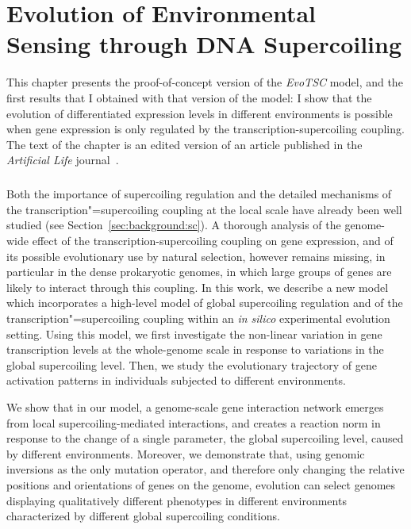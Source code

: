 \chapter{Evolution of Environmental Sensing through DNA Supercoiling}
\label{chap:alife}

This chapter presents the proof-of-concept version of the \emph{EvoTSC} model, and the first results that I obtained with that version of the model: I show that the evolution of differentiated expression levels in different environments is possible when gene expression is only regulated by the transcription-supercoiling coupling.
The text of the chapter is an edited version of an article published in the \emph{Artificial Life} journal~\citep{grohens2022a}.

\paragraph{}
Both the importance of supercoiling regulation and the detailed mechanisms of the transcription"=supercoiling coupling at the local scale have already been well studied (see Section~\ref{sec:background:sc}). A thorough analysis of the genome-wide effect of the transcription-supercoiling coupling on gene expression, and of its possible evolutionary use by natural selection, however remains missing, in particular in the dense prokaryotic genomes, in which large groups of genes are likely to interact through this coupling.
In this work, we describe a new model which incorporates a high-level model of global supercoiling regulation and of the transcription"=supercoiling coupling within an \emph{in silico} experimental evolution setting.
Using this model, we first investigate the non-linear variation in gene transcription levels at the whole-genome scale in response to variations in the global supercoiling level.
Then, we study the evolutionary trajectory of gene activation patterns in individuals subjected to different environments.

We show that in our model, a genome-scale gene interaction network emerges from local supercoiling-mediated interactions, and creates a reaction norm in response to the change of a single parameter, the global supercoiling level, caused by different environments.
Moreover, we demonstrate that, using genomic inversions as the only mutation operator, and therefore only changing the relative positions and orientations of genes on the genome, evolution can select genomes displaying qualitatively different phenotypes in different environments characterized by different global supercoiling conditions.

